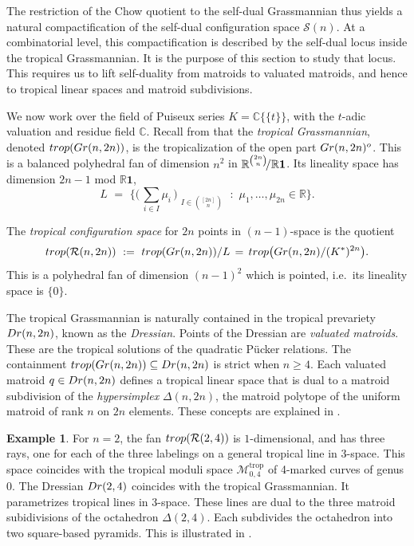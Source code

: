 \documentclass[12pt]{extarticle}
\theoremstyle{definition}
\newtheorem{example}[theorem]{Example}
\numberwithin{theorem}{section}
\theoremstyle{plain}\newtheorem{ithm}{Theorem}
\newcommand{\RR}{\mathbb{R}}
\newcommand{\CC}{\mathbb{C} }
\begin{document}
  The restriction of the Chow quotient to the self-dual Grassmannian
  thus yields a natural compactification of 
  the self-dual configuration space $\mathcal{S}(n)$.
  At a combinatorial level, this compactification is described
  by the self-dual locus inside the tropical Grassmannian.
  It is the purpose of this section to study that locus.
  This requires us to lift self-duality from matroids to valuated matroids,
  and hence to tropical linear spaces and matroid subdivisions.
  

  We now work over the field  of  Puiseux series  $K=\CC\{\!\{t\}\!\}$,
  with the $t$-adic valuation and
    residue field $\CC$.
  Recall from \cite[Section 4.3]{MS} that
  the {\em tropical Grassmannian}, denoted ${\rm trop}({\rm Gr}(n,2n))$, is the tropicalization of the open part ${\rm Gr}(n,2n)^o$. This
  is a balanced polyhedral fan of  dimension $n^2$ in $\RR^{\binom{2n}{n}}\!/\RR {\bf 1}$. Its lineality space  
  has dimension $2n-1$ mod $\mathbb{R}\mathbf{1}$,
   $$ L \,\, = \,\,
   \biggl\{ \bigl(\,\sum_{i\in I}\mu_i \,\bigr)_{\substack{ I \in \binom{[2n]}{n}} }\,\, :
    \,\, \mu_1,\ldots,\mu_{2n} \in \RR
   \biggr\}. $$
   
  The {\em tropical configuration space} for $2n$ points in $(n-1)$-space is the quotient 
$$ {\rm trop}(\mathcal{R}(n,2n)) \,\,:=\,\, {\rm trop}({\rm Gr}(n,2n))/L 
\,= \,{\rm trop}\bigl({\rm Gr}(n,2n)/(K^*)^{2n} \bigr).$$ 
This is a polyhedral fan of dimension $(n-1)^2$ which is pointed, i.e.~its lineality space is $\{0\}$.

  The tropical Grassmannian is naturally contained in the tropical prevariety $ {\rm Dr}(n,2n)$,
  known as the {\em Dressian}. Points of the Dressian are {\em valuated matroids}.
  These are the tropical solutions of the quadratic P\"ucker relations.
  The containment $ {\rm trop}({\rm Gr}(n,2n)) \subseteq {\rm Dr}(n,2n) $ is strict when $n \geq 4$.  Each 
  valuated matroid $q \in{\rm Dr}(n,2n)$ defines a tropical linear space
  that is dual to a matroid subdivision of the {\em hypersimplex}
  $\Delta(n,2n)$, the matroid polytope of the uniform matroid of rank $n$ on $2n$ elements.
  These concepts are explained in \cite[Section 4.4]{MS}.
  
  \begin{example}
    For $n=2$, the fan ${\rm trop}(\mathcal{R}(2,4))$ is $1$-dimensional, and has
    three rays, one for each of the three labelings on a general tropical line in $3$-space. This space coincides with the tropical moduli space $\mathcal{M}^{\text{trop}}_{0,4}$ of 4-marked curves of genus $0$.
    The Dressian $ {\rm Dr}(2,4)$ coincides with the tropical Grassmannian. It parametrizes tropical lines in 3-space. These lines are dual to the three matroid subidivisions of the octahedron $\Delta(2,4)$.  Each subdivides the octahedron into two square-based pyramids.
    This is illustrated in \cite[Figure 4.4.1]{MS}.
  \end{example}
  
\end{document}
